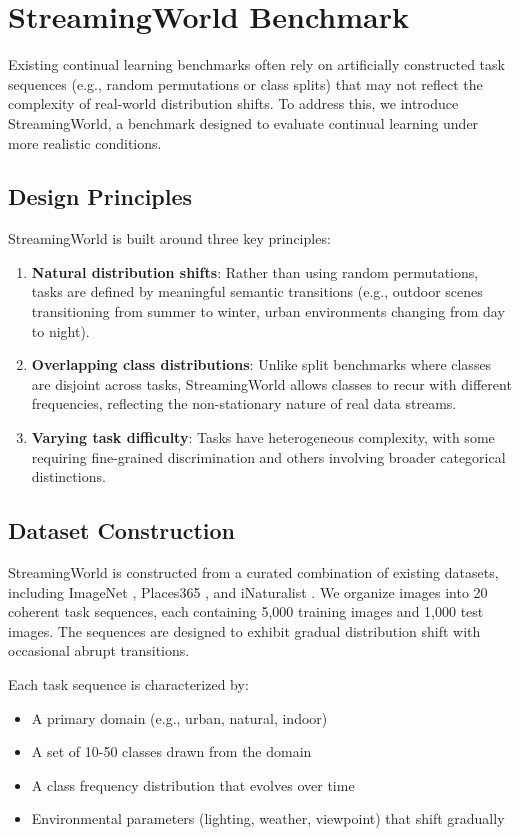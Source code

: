 \documentclass[11pt]{article}
\begin{document}
\section{StreamingWorld Benchmark}
\label{sec:benchmark}

Existing continual learning benchmarks often rely on artificially constructed task sequences (e.g., random permutations or class splits) that may not reflect the complexity of real-world distribution shifts. To address this, we introduce StreamingWorld, a benchmark designed to evaluate continual learning under more realistic conditions.

\subsection{Design Principles}

StreamingWorld is built around three key principles:
\begin{enumerate}
    \item \textbf{Natural distribution shifts}: Rather than using random permutations, tasks are defined by meaningful semantic transitions (e.g., outdoor scenes transitioning from summer to winter, urban environments changing from day to night).
    \item \textbf{Overlapping class distributions}: Unlike split benchmarks where classes are disjoint across tasks, StreamingWorld allows classes to recur with different frequencies, reflecting the non-stationary nature of real data streams.
    \item \textbf{Varying task difficulty}: Tasks have heterogeneous complexity, with some requiring fine-grained discrimination and others involving broader categorical distinctions.
\end{enumerate}

\subsection{Dataset Construction}

StreamingWorld is constructed from a curated combination of existing datasets, including ImageNet \citep{deng2009imagenet}, Places365 \citep{zhou2017places}, and iNaturalist \citep{van2018inaturalist}. We organize images into 20 coherent task sequences, each containing 5,000 training images and 1,000 test images. The sequences are designed to exhibit gradual distribution shift with occasional abrupt transitions.

Each task sequence is characterized by:
\begin{itemize}
    \item A primary domain (e.g., urban, natural, indoor)
    \item A set of 10-50 classes drawn from the domain
    \item A class frequency distribution that evolves over time
    \item Environmental parameters (lighting, weather, viewpoint) that shift gradually
\end{itemize}
\end{document}
